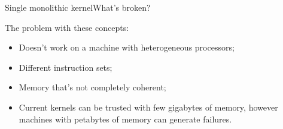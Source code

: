 \documentclass[10pt]{beamer}
\begin{document}
\begin{frame}{Single monolithic kernel}{What's broken?}
  \begin{block}{}
    The problem with these concepts:
  \end{block} \pause

  \begin{itemize}
    \item Doesn't work on a machine with heterogeneous processors; \pause
    \item Different instruction sets; \pause
    \item Memory that's not completely coherent; \pause
    \item Current kernels can be trusted with few gigabytes of memory, however
          machines with petabytes of memory can generate failures.
  \end{itemize}

\end{frame}

\end{document}
